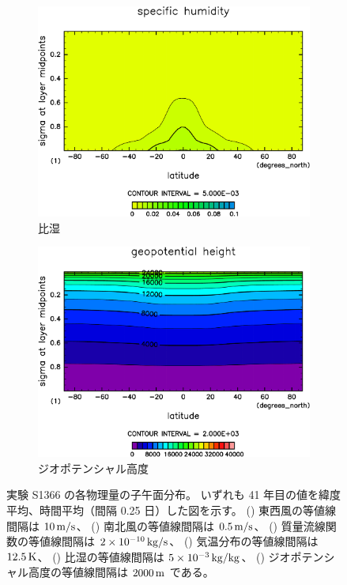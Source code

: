 \documentclass[body]{subfiles}
\begin{document}
\begin{figure}[t]
\begin{subfigure}{.4\textwidth}
		\includegraphics[width=\columnwidth]{S1366/QH2OVap,time=14600:14965-crop-rotate.pdf}
		\caption{比湿\hmu*{[kg/kg]}}\label{S1366比湿}
	\end{subfigure}
	\begin{subfigure}{.4\textwidth}
		\centering
		\includegraphics[width=\columnwidth]{S1366/Height,time=14600:14965-crop-rotate.pdf}
		\caption{ジオポテンシャル高度\hmu*{[m/s]}}\label{S1366ジオポテンシャル高度}
	\end{subfigure}
	\caption[実験 S1366 の各物理量の子午面分布]{
		実験 S1366 の各物理量の子午面分布。
		いずれも 41 年目の値を緯度平均、時間平均（間隔 0.25 日）した図を示す。
		() 東西風の等値線間隔は \(10\hmu{m/s}\)、
		() 南北風の等値線間隔は \(0.5\hmu{m/s}\)、
		() 質量流線関数の等値線間隔は \(2\hme{-10}\hmu{kg/s}\)、
		() 気温分布の等値線間隔は \(12.5\hmu{K}\)、
		() 比湿の等値線間隔は \(5\hme{-3}\hmu{kg/kg}\)、
		() ジオポテンシャル高度の等値線間隔は \(2000\hmu{m}\) である。
	}\label{S1366}
\end{figure}
\end{document}
